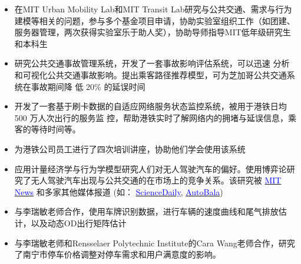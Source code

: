 \begin{itemize}[parsep=0.5ex]
  \item 在MIT Urban Mobility Lab和MIT Transit Lab研究与公共交通、需求与行为建模等相关的问题，参与多个基金项目申请，协助实验室组织工作（如团建、服务器管理，两次获得实验室乐于助人奖），协助导师指导MIT低年级研究生和本科生
\end{itemize}
\begin{itemize}[parsep=0.5ex]
  \item 研究公共交通事故管理系统，开发了一套事故影响评估系统，可以迅速
分析和可视化公共交通事故影响。提出乘客路径推荐模型，可为芝加哥公共交通系统在事故期间降
低 20\% 的延误时间
\end{itemize}
\begin{itemize}[parsep=0.5ex]
  \item 开发了一套基于刷卡数据的自适应网络服务状态监控系统，被用于港铁日均 500 万人次出行的服务监
控，帮助港铁实时了解网络内的拥堵与延误信息，乘客的等待时间等。
\item 为港铁公司员工进行了四次培训讲座，协助他们学会使用该系统
\end{itemize}
\begin{itemize}[parsep=0.5ex]
  \item 应用计量经济学与行为学模型研究人们对无人驾驶汽车的偏好。使用博弈论研究了无人驾驶汽车出现与公共交通的在市场上的竞争关系。该研究被 {\href{https://news.mit.edu/2021/smart-evaluates-competition-between-autonomous-vehicles-public-transit-0604}{\textcolor{blue}{{ MIT News}}}} 和多家其他媒体报道 (如： {\href{https://www.sciencedaily.com/releases/2021/05/210505102023.htm}{\textcolor{blue}{{ScienceDaily}}}}, {\href{https://autobala.com/smart-assesses-the-impact-of-competition-between-self-driving-cars-and-public-transport-sciencedaily/30616/}{\textcolor{blue}{{AutoBala}}}})
\end{itemize}
\begin{itemize}[parsep=0.5ex]
  \item 与李瑞敏老师合作，使用车牌识别数据，进行车辆的速度曲线和尾气排放估计，以及动态OD出行矩阵估计
  \item 与李瑞敏老师和Rensselaer Polytechnic Institute的Cara Wang老师合作，研究了南宁市停车价格调整对停车需求和用户满意度的影响。
\end{itemize}
